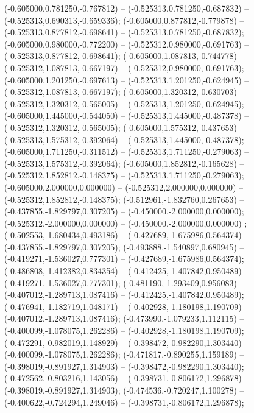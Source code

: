  (-0.605000,0.781250,-0.767812) -- (-0.525313,0.781250,-0.687832) -- (-0.525313,0.690313,-0.659336);
 (-0.605000,0.877812,-0.779878) -- (-0.525313,0.877812,-0.698641) -- (-0.525313,0.781250,-0.687832);
 (-0.605000,0.980000,-0.772200) -- (-0.525312,0.980000,-0.691763) -- (-0.525313,0.877812,-0.698641);
 (-0.605000,1.087813,-0.744778) -- (-0.525312,1.087813,-0.667197) -- (-0.525312,0.980000,-0.691763);
 (-0.605000,1.201250,-0.697613) -- (-0.525313,1.201250,-0.624945) -- (-0.525312,1.087813,-0.667197);
 (-0.605000,1.320312,-0.630703) -- (-0.525312,1.320312,-0.565005) -- (-0.525313,1.201250,-0.624945);
 (-0.605000,1.445000,-0.544050) -- (-0.525313,1.445000,-0.487378) -- (-0.525312,1.320312,-0.565005);
 (-0.605000,1.575312,-0.437653) -- (-0.525313,1.575312,-0.392064) -- (-0.525313,1.445000,-0.487378);
 (-0.605000,1.711250,-0.311512) -- (-0.525313,1.711250,-0.279063) -- (-0.525313,1.575312,-0.392064);
 (-0.605000,1.852812,-0.165628) -- (-0.525312,1.852812,-0.148375) -- (-0.525313,1.711250,-0.279063);
 (-0.605000,2.000000,0.000000) -- (-0.525312,2.000000,0.000000) -- (-0.525312,1.852812,-0.148375);
 (-0.512961,-1.832760,0.267653) -- (-0.437855,-1.829797,0.307205) -- (-0.450000,-2.000000,0.000000);
 (-0.525312,-2.000000,0.000000) -- (-0.450000,-2.000000,0.000000) ;
 (-0.502553,-1.680434,0.493186) -- (-0.427689,-1.675986,0.564374) -- (-0.437855,-1.829797,0.307205);
 (-0.493888,-1.540897,0.680945) -- (-0.419271,-1.536027,0.777301) -- (-0.427689,-1.675986,0.564374);
 (-0.486808,-1.412382,0.834354) -- (-0.412425,-1.407842,0.950489) -- (-0.419271,-1.536027,0.777301);
 (-0.481190,-1.293409,0.956083) -- (-0.407012,-1.289713,1.087416) -- (-0.412425,-1.407842,0.950489);
 (-0.476941,-1.182719,1.048171) -- (-0.402928,-1.180198,1.190709) -- (-0.407012,-1.289713,1.087416);
 (-0.473990,-1.079233,1.112115) -- (-0.400099,-1.078075,1.262286) -- (-0.402928,-1.180198,1.190709);
 (-0.472291,-0.982019,1.148929) -- (-0.398472,-0.982290,1.303440) -- (-0.400099,-1.078075,1.262286);
 (-0.471817,-0.890255,1.159189) -- (-0.398019,-0.891927,1.314903) -- (-0.398472,-0.982290,1.303440);
 (-0.472562,-0.803216,1.143056) -- (-0.398731,-0.806172,1.296878) -- (-0.398019,-0.891927,1.314903);
 (-0.474536,-0.720247,1.100278) -- (-0.400622,-0.724294,1.249046) -- (-0.398731,-0.806172,1.296878);
